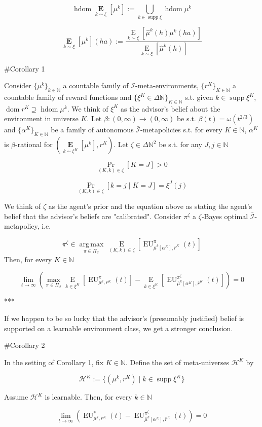 \documentclass[a4paper]{article}
\DeclareMathOperator{\Supp}{supp}
\DeclareMathOperator{\Dom}{dom}
\newcommand{\E}[1]{\underset{#1}{\operatorname{E}}}
\newcommand{\Argmax}[1]{\underset{#1}{\operatorname{arg\,max}}\,}
\newcommand{\Nats}{\mathbb{N}}
\newcommand{\I}{\mathcal{I}}
\newcommand{\Adi}{\bar{\I}}
\DeclareMathOperator{\HD}{hdom}
\newcommand{\Hy}{\mathcal{H}}
\newcommand{\EU}{\operatorname{EU}}
\newcommand{\BE}[1]{\underset{#1}{\boldsymbol{\operatorname{E}}}}
\begin{document}
$$\HD{\BE{k \sim \xi}[\mu^k]}:= \bigcup_{k \in \Supp \xi} \HD{\mu^k}$$

$$\BE{k \sim \xi}[\mu^k](ha):=\frac{\E{k \sim \xi}[ \hat{\mu}^k(h)\mu^k(ha)]}{\E{k \sim \xi}[ \hat{\mu}^k(h)]}$$

\#Corollary 1

Consider $\{\mu^k\}_{k \in \Nats}$ a countable family of $\I$-meta-environments, $\{r^K\}_{K \in \Nats}$ a countable family of reward functions and $\{\xi^K \in \Delta\Nats\}_{K \in \Nats}$ s.t. given $k \in \Supp \xi^K$, $\Dom{r^K} \supseteq \HD{\mu^k}$. We think of $\xi^K$ as the advisor's belief about the environment in universe $K$. Let $\beta: (0,\infty) \rightarrow (0,\infty)$ be s.t. $\beta(t) = \omega(t^{2/3})$ and $\{\alpha^K\}_{K \in \Nats}$ be a family of autonomous $\Adi$-metapolicies s.t. for every $K \in \Nats$, $\alpha^K$ is $\beta$-rational for $(\BE{k \sim \xi^K}[\mu^k], r^K)$. Let $\zeta \in \Delta\Nats^2$ be s.t. for any $J,j \in \Nats$

$$\Pr_{(K,k) \in \zeta}[K = J] > 0$$ 

$$\Pr_{(K,k) \in \zeta}[k = j \mid K = J] = \xi^J(j)$$ 

We think of $\zeta$ as the agent's prior and the equation above as stating the agent's belief that the advisor's beliefs are "calibrated". Consider $\pi^\zeta$ a $\zeta$-Bayes optimal $\Adi$-metapolicy, i.e.

$$\pi^\zeta \in \Argmax{\pi \in \Pi_{\Adi}}{\E{(K,k) \in \zeta}[\EU_{\bar{\mu}^k[\alpha^K],\bar{r}^K}^\pi(t)]}$$ 
Then, for every $K \in \Nats$

$$\lim_{t \rightarrow \infty} (\max_{\pi \in \Pi_\I} \E{k \in \xi^K}[\EU_{\mu^k,r^K}^\pi(t)] - \E{k \in \xi^K}[\EU_{\bar{\mu}^k[\alpha^K],\bar{r}^K}^{\pi^\zeta}(t)]) = 0$$

***

If we happen to be so lucky that the advisor's (presumably justified) belief is supported on a learnable environment class, we get a stronger conclusion.

\#Corollary 2

In the setting of Corollary 1, fix $K \in \Nats$. Define the set of meta-universes $\Hy^K$ by

$$\Hy^K:= \{(\mu^k, r^K) \mid k \in \Supp \xi^K\}$$

Assume $\Hy^K$ is learnable. Then, for every $k \in \Nats$


$$\lim_{t \rightarrow \infty} (\EU_{\mu^k,r^K}^*(t) - \EU_{\bar{\mu}^k[\alpha^K],\bar{r}^K}^{\pi^\zeta}(t)) = 0$$
\end{document}
